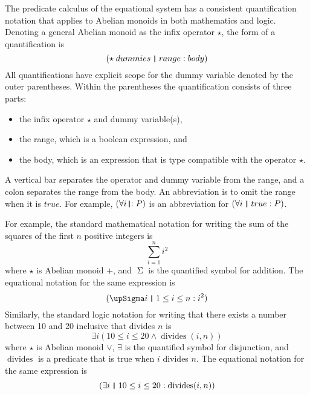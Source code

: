 \documentclass[12pt, fleqn, leqno]{article}
\DeclareMathOperator{\divides}{divides}
\newcommand{\thedr}{\rule[-.25ex]{.32mm}{1.75ex}}   %
\newcommand{\dr}{\;\,\thedr\,\;}                    %
\newcommand{\rb}{:}                                 %
\newcommand{\drrb}{\;\thedr\,{:}\;}                 %
\newcommand{\all}{\forall}                          %
\newcommand{\ext}{\exists}                          %
\begin{document}
The predicate calculus of the equational system has a consistent quantification notation that applies to Abelian monoids in both mathematics and logic.
Denoting a general Abelian monoid as the infix operator $\star$, the form of a quantification is
\[
(\star\; dummies\dr range\rb body)
\]
All quantifications have explicit scope for the dummy variable denoted by the outer parentheses.
Within the parentheses the quantification consists of three parts:
\begin{itemize}
\item the infix operator $\star$ and dummy variable(s),
\item the range, which is a boolean expression, and
\item the body, which is an expression that is type compatible with the operator $\star$.
\end{itemize}
A vertical bar separates the operator and dummy variable from the range, and a colon separates the range from the body.
An abbreviation is to omit the range when it is $true$.
For example, $(\all i\drrb P)$ is an abbreviation for $(\all i\dr true \rb P)$.

For example, the standard mathematical notation for writing the sum of the squares of the first $n$ positive integers is
\[
\sum_{i=1}^{n}i^2
\]
where $\star$ is Abelian monoid $+$, and $\upSigma$ is the quantified symbol for addition.
The equational notation for the same expression is
\[
(\upSigma i\dr 1\le i\le n \rb i^2)
\]
Similarly, the standard logic notation for writing that there exists a number between 10 and 20 inclusive that divides $n$ is
\[
\ext i(10\le i\le 20 \land \divides(i,n))
\]
where $\star$ is Abelian monoid $\lor$, $\ext$ is the quantified symbol for disjunction, and $\divides$ is a predicate that is true when $i$ divides $n$.
The equational notation for the same expression is
\[
(\ext i\dr 10\le i\le 20 \rb \divides(i,n))
\]
\end{document}
